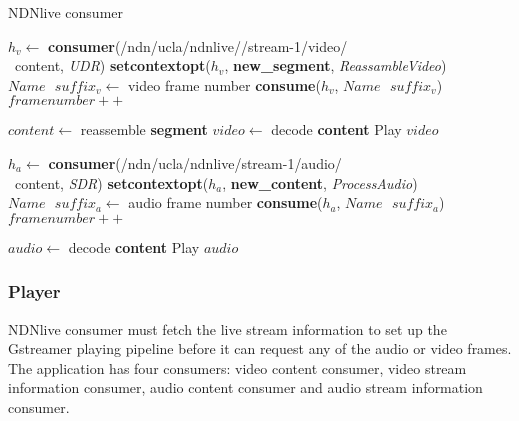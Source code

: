\begin{algorithm}[hbt]
\caption{NDNlive consumer}
\label{alg:liveconsumer}
\begin{algorithmic}[2]
\State $h_v \leftarrow $ \textbf{consumer}(/ndn/ucla/ndnlive//stream-1/video/\\\ content, \textit{UDR})
\State \textbf{setcontextopt}($h_v$, \textbf{new\_segment}, \textit{ReassambleVideo})
\vspace{0.2cm}
	\State $Name \textbf{ } suffix_v \leftarrow $ video frame number
	\State \textbf{consume}($h_v$, $Name\textbf{ }suffix_v$)
	\State $framenumber ++$
	\EndWhile
\vspace{0.2cm}

    \State $content \leftarrow $ reassemble \textbf{segment}
		\State $video \leftarrow $ decode \textbf{content}
	   	\State Play $video$
	\EndIf
\EndFunction

\vspace{0.4cm}

\State $h_a \leftarrow $ \textbf{consumer}(/ndn/ucla/ndnlive/stream-1/audio/\\\ content, \textit{SDR})
\State \textbf{setcontextopt}($h_a$, \textbf{new\_content}, \textit{ProcessAudio})
\vspace{0.2cm}
	\State $Name \textbf{ } suffix_a \leftarrow $ audio frame number
	\State \textbf{consume}($h_a$, $Name\textbf{ }suffix_a$)
	\State $framenumber ++$
	\EndWhile
\vspace{0.2cm}

   	\State $audio \leftarrow $ decode \textbf{content}
   	\State Play $audio$
\EndFunction
\end{algorithmic}
\end{algorithm}

\subsubsection{Player}
\label{ssub:ndnlive_con}
NDNlive consumer must fetch the live stream information to set up the Gstreamer playing pipeline before it can request any of the audio or video frames. The application has four consumers: video content consumer, video stream information consumer, audio content consumer and audio stream information consumer. 

